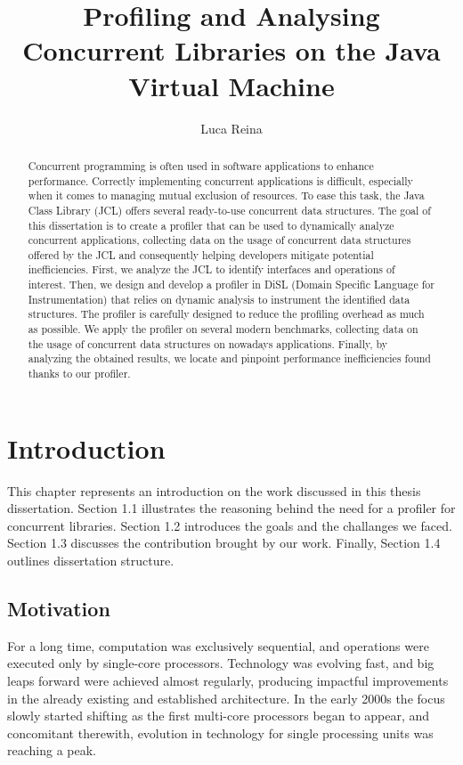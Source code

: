 \documentclass[]{usiinfthesis}
\title{Profiling and Analysing Concurrent Libraries on the Java Virtual Machine}
\author{Luca Reina}
\begin{document}
\maketitle
\frontmatter
\begin{abstract}

\large
Concurrent programming is often used in software applications to enhance performance. Correctly implementing concurrent applications is difficult, especially when it comes to managing mutual exclusion of resources. To ease this task, the Java Class Library (JCL) offers several ready-to-use concurrent data structures. \newline The goal of this dissertation is to create a profiler that can be used to dynamically analyze concurrent applications, collecting data on the usage of concurrent data structures offered by the JCL and consequently helping developers mitigate potential inefficiencies. \newline First, we analyze the JCL to identify interfaces and operations of interest. Then, we design and develop a profiler in DiSL (Domain Specific Language for Instrumentation) that relies on dynamic analysis to instrument the identified data structures. The profiler is carefully designed to reduce the profiling overhead as much as possible. We apply the profiler on several modern benchmarks, collecting data on the usage of concurrent data structures on nowadays applications. Finally, by analyzing the obtained results, we locate and pinpoint performance inefficiencies found thanks to our profiler. 
\end{abstract}
\begin{acknowledgements}
\end{acknowledgements}
\tableofcontents
\listoffigures
\listoftables
\mainmatter
\chapter{Introduction}
\large
This chapter represents an introduction on the work discussed in this thesis dissertation. Section 1.1 illustrates the reasoning behind the need for a profiler for concurrent libraries. Section 1.2 introduces the goals and the challanges we faced. Section 1.3 discusses the contribution brought by our work. Finally, Section 1.4 outlines dissertation structure.


\section{Motivation}
For a long time, computation was exclusively sequential, and operations were executed only by single-core processors. Technology was evolving fast, and big leaps forward were achieved almost regularly, producing impactful improvements in the already existing and established architecture. In the early 2000s the focus slowly started shifting as the first multi-core processors began to appear, and concomitant therewith, evolution in technology for single processing units was reaching a peak. 
\end{document}
